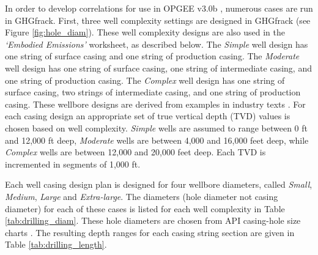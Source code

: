 \documentclass[11pt]{report}
\newcommand{\version}{v3.0b }
\newcommand{\sheet}[1]{\textit{`{#1}'}}
\begin{document}
In order to develop correlations for use in OPGEE \version, numerous cases are run in GHGfrack.  First, three well complexity settings are designed in GHGfrack (see Figure \ref{fig:hole_diam}).  These well complexity designs are also used in the \sheet{Embodied Emissions} worksheet, as described below. The \emph{Simple} well design has one string of surface casing and one string of production casing.  The \emph{Moderate} well design has one string of surface casing, one string of intermediate casing, and one string of production casing.  The \emph{Complex} well design has one string of surface casing, two strings of intermediate casing, and one string of production casing.  These wellbore designs are derived from examples in industry texts \cite{Mitchell2006}. For each casing design an appropriate set of true vertical depth (TVD) values is chosen based on well complexity. \emph{Simple} wells are assumed to range between 0 ft and 12,000 ft deep, \emph{Moderate} wells are between 4,000 and 16,000 feet deep, while \emph{Complex} wells are between 12,000 and 20,000 feet deep.  Each TVD is incremented in segments of 1,000 ft.  

Each well casing design plan is designed for four wellbore diameters, called \emph{Small}, \emph{Medium}, \emph{Large} and \emph{Extra-large}.  The diameters (hole diameter not casing diameter) for each of these cases is listed for each well complexity in Table \ref{tab:drilling_diam}.  These hole diameters are chosen from API casing-hole size charts \cite[Figure 11.22]{Mitchell2006}.   The resulting depth ranges for each casing string section are given in Table \ref{tab:drilling_length}.  
\end{document}
